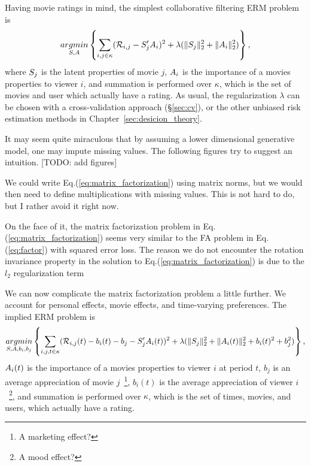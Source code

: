Having movie ratings in mind, the simplest collaborative filtering ERM problem is 
\begin{align}
\label{eq:matrix_factorization}
	\mathop{argmin} _{S,A}\left\{ \sum_{i,j \in \kappa} (\mathcal{R}_{i,j} - S_j' A_i)^2 + \lambda (\Vert S_j \Vert_2^2+ \Vert A_i \Vert_2^2) \right\},
\end{align}
where $S_j$ is the latent properties of movie $j$, 
$A_i$ is the importance of a movies properties to viewer $i$,
and summation is performed over $\kappa$, which is the set of movies and user which actually have a rating.
As usual, the regularization $\lambda$ can be chosen with a cross-validation approach (\S\ref{sec:cv}), or the other unbiased risk estimation methods in Chapter~\ref{sec:desicion_theory}.

It may seem quite miraculous that by assuming a lower dimensional generative model, one may impute missing values.
The following figures try to suggest an intuition.
[TODO: add figures]



\begin{remark}
We could write Eq.(\ref{eq:matrix_factorization}) using matrix norms, but we would then need to define multiplications with missing values. This is not hard to do, but I rather avoid it right now.
\end{remark}

\begin{remark}
On the face of it, the matrix factorization problem in Eq.(\ref{eq:matrix_factorization}) seems very similar to the FA problem in Eq.(\ref{eq:factor}) with squared error loss.
The reason we do not encounter the rotation invariance property in the solution to Eq.(\ref{eq:matrix_factorization}) is due to the $l_2$ regularization term 
\end{remark}

We can now complicate the matrix factorization problem a little further.
We account for personal effects, movie effects, and time-varying preferences.
The implied ERM problem is 
\begin{align}
\label{eq:matrix_factorization_comlicated}
	\mathop{argmin} _{S,A, b_i, b_j}\left\{ 
		\sum_{i,j,t \in \kappa} (\mathcal{R}_{i,j}(t) - b_i(t) - b_j- S_j' A_i(t))^2 + \lambda (\Vert S_j \Vert_2^2+ \Vert A_i(t) \Vert_2^2 + b_i(t)^2 + b_j^2 )
	 \right\},
\end{align}
$A_i(t)$ is the importance of a movies properties to viewer $i$ at period $t$,
$b_j$ is an average appreciation of movie $j$~\footnote{A marketing effect?},
$b_i(t)$ is the average appreciation of viewer $i$~\footnote{A mood effect?},
and summation is performed over $\kappa$, which is the set of times, movies, and users, which actually have a rating.

